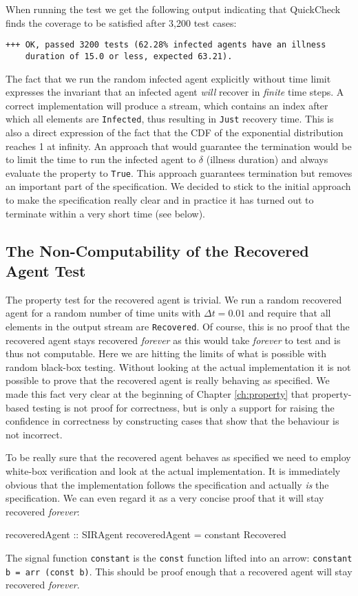 When running the test we get the following output indicating that QuickCheck finds the coverage to be satisfied after 3,200 test cases:

\begin{verbatim}
+++ OK, passed 3200 tests (62.28% infected agents have an illness 
    duration of 15.0 or less, expected 63.21).
\end{verbatim}

The fact that we run the random infected agent explicitly without time limit expresses the invariant that an infected agent \textit{will} recover in \textit{finite} time steps. A correct implementation will produce a stream, which contains an index after which all elements are \texttt{Infected}, thus resulting in \texttt{Just} recovery time. This is also a direct expression of the fact that the CDF of the exponential distribution reaches 1 at infinity. An approach that would guarantee the termination would be to limit the time to run the infected agent to $\delta$ (illness duration) and always evaluate the property to \texttt{True}. This approach guarantees termination but removes an important part of the specification. We decided to stick to the initial approach to make the specification really clear and in practice it has turned out to terminate within a very short time (see below).

\subsection{The Non-Computability of the Recovered Agent Test}
The property test for the recovered agent is trivial. We run a random recovered agent for a random number of time units with $\Delta t = 0.01$ and require that all elements in the output stream are \texttt{Recovered}. Of course, this is no proof that the recovered agent stays recovered \textit{forever} as this would take \textit{forever} to test and is thus not computable. Here we are hitting the limits of what is possible with random black-box testing. Without looking at the actual implementation it is not possible to prove that the recovered agent is really behaving as specified. We made this fact very clear at the beginning of Chapter \ref{ch:property} that property-based testing is not proof for correctness, but is only a support for raising the confidence in correctness by constructing cases that show that the behaviour is not incorrect.

To be really sure that the recovered agent behaves as specified we need to employ white-box verification and look at the actual implementation. It is immediately obvious that the implementation follows the specification and actually \textit{is} the specification. We can even regard it as a very concise proof that it will stay recovered \textit{forever}:

\begin{HaskellCode}
recoveredAgent :: SIRAgent
recoveredAgent = constant Recovered
\end{HaskellCode}

The signal function \texttt{constant} is the \texttt{const} function lifted into an arrow: \texttt{constant b = arr (const b)}. This should be proof enough that a recovered agent will stay recovered \textit{forever}.